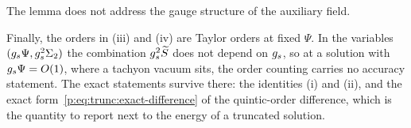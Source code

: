 The lemma does not address the gauge structure of the auxiliary field.

Finally, the orders in (iii) and (iv) are Taylor orders at fixed $\Psi$.
In the variables $(g_s \Psi, g_s^2 \Sigma_2)$ the combination $g_s^2 \widetilde{S}_{}$ does not depend on $g_s$, so at a solution with $g_s \Psi = O(1)$, where a tachyon vacuum sits, the order counting carries no accuracy statement.
The exact statements survive there: the identities (i) and (ii), and the exact form~\eqref{p:eq:trunc:exact-difference} of the quintic-order difference, which is the quantity to report next to the energy of a truncated solution.

